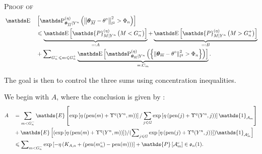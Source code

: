 \begin{pro}{\textsc{Proof of } \\}
\begin{alignat*}{2}
& \E&&\left[\P^{(\eta)}_{\boldsymbol{\theta}_{\overline{M}} \vert Y^{n}}\left(\left\Vert \boldsymbol{\theta}_{\overline{M}} - \theta^{\circ}\right\Vert_{l^{2}}^{2} > \Phi_{n} \right)\right] \\
& && \leq\underbrace{\E\left[\mathds{P}_{M \vert Y^{n}}^{(\eta)}\left(M < G^{-}_{n}\right)\right]}_{=: A} + \underbrace{\E\left[\mathds{P}_{M \vert Y^{n}}^{(\eta)}\left(M > G^{+}_{n}\right)\right]}_{=: B}\\
& && + \sum\nolimits_{G^{-}_{n} \leq m \leq G^{+}_{n}}\underbrace{\E\left[\P^{(\eta)}_{\boldsymbol{\theta}_{\overline{m}} \vert Y^{n}}\left(\left\{\left\Vert \boldsymbol{\theta}_{\overline{m}} - \theta^{\circ}\right\Vert_{l^{2}}^{2} > \Phi_{n}\right\}\right)\right]}_{=:C_{m}}.
\end{alignat*}

The goal is then to control the three sums using concentration inequalities.

We begin with $A$, where the conclusion is given by :
\begin{alignat*}{2}
& A && = \sum\limits_{m < G^{-}_{n}} \mathds{E}\left[\exp\left[\eta\left(\pen(m) + \Upsilon^{\eta}(Y^{n}, m)\right)\right]/\sum\limits_{j \leq G}\exp\left[\eta \left(\pen(j) + \Upsilon^{\eta}(Y^{n}, j)\right)\right] \mathds{1}_{\mathcal{A}_{m}}\right] \\
& && + \mathds{E}\left[(\exp\left[\eta\left(\pen(m) + \Upsilon^{\eta}(Y^{n}, m)\right)\right])/(\sum\nolimits_{j \leq G}\exp\left[\eta \left(\pen(j) + \Upsilon^{\eta}(Y^{n}, j)\right)\right]) \mathds{1}_{\mathcal{A}_{m}^{c}}\right]\\
& && \leq \sum\nolimits_{m < G^{-}_{n}} \exp\left[-\eta\left(K_{A, n} + (\pen(m^{\circ}_{n}) - \pen(m))\right)\right] + \mathds{P}\left[ \mathcal{A}_{m}^{c}\right] \in \mathfrak{o}_{n}(1).
\end{alignat*}


\end{pro}
